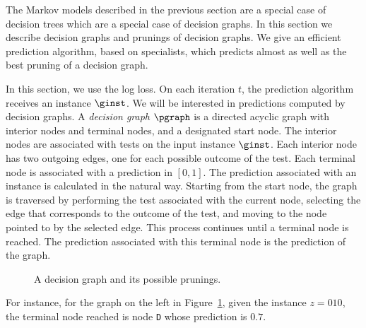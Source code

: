 \iffalse
\note{MW: This can be simplified.
The edges of the dags do not have to be labeled
(I explained this to Rob!)
An example is simply a path from a source (there
can be more than one source) to a sink.
A cut has to be such that it cut each such path exactly once.

More abstractly: There are two families of sets.
The first family constitutes the possible examples
the the second the possible cuts.
The property we are using is that each example set
intersects each cut at exactly one point.
}
\fi

The Markov models described in the previous section are a special case
of decision trees which are a special case of decision graphs. In this
section we describe decision graphs and prunings of decision graphs. 
We give an efficient prediction algorithm, based on specialists, which
predicts almost as well as the best pruning of a decision graph.

In this section, we use the log loss.
On each iteration $t$, the prediction
algorithm receives an instance $\ginst$.
We will be interested in predictions computed by decision graphs.
A {\em decision graph} $\pgraph$ is a directed acyclic graph with
interior nodes and {terminal} nodes, and a designated start node.
The interior
nodes are associated with tests on the input instance $\ginst$.
Each interior
node has two outgoing edges, one for each possible outcome of the test. 
Each terminal node is associated with a prediction in $[0,1]$.
The prediction associated with an instance is calculated in the
natural way.
Starting from the start node, the graph is traversed by performing the
test associated with the current node, selecting the edge that corresponds
to the outcome of the test, and moving to the node pointed to
by the selected edge. This process continues until a terminal node is
reached. The prediction associated with this terminal node is the
prediction of the graph.

\begin{figure}[t]
\centerline{
}
\figline
\caption{\label{f:decgraph}
A decision graph and its possible prunings.}
\end{figure}

For instance, for the graph on the left in
Figure~\ref{f:decgraph}, given the instance $z = 010$, the terminal
node reached is node {\tt D} whose prediction
is $0.7$.

